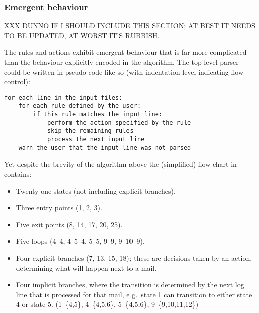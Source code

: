 \subsubsection{Emergent behaviour}

\label{Emergent behaviour}

XXX DUNNO IF I SHOULD INCLUDE THIS SECTION\@; AT BEST IT NEEDS TO BE
UPDATED, AT WORST IT'S RUBBISH\@.

The rules and actions exhibit emergent behaviour that is far more
complicated than the behaviour explicitly encoded in the algorithm.  The
top-level parser could be written in pseudo-code like so (with indentation
level indicating flow control):

\begin{verbatim}
for each line in the input files:
    for each rule defined by the user:
        if this rule matches the input line:
            perform the action specified by the rule
            skip the remaining rules
            process the next input line
    warn the user that the input line was not parsed
\end{verbatim}

Yet despite the brevity of the algorithm above the (simplified) flow chart
in  contains:

\begin{itemize}

    \item Twenty one states (not including explicit branches).

    \item Three entry points (1, 2, 3).

    \item Five exit points (8, 14, 17, 20, 25).

    \item Five loops (4--4, 4--5--4, 5--5, 9--9, 9--10--9).

    \item Four explicit branches (7, 13, 15, 18); these are decisions taken
        by an action, determining what will happen next to a mail.

    \item Four implicit branches, where the transition is determined by the
        next log line that is processed for that mail, e.g.\ state 1 can
        transition to either state 4 or state 5.  (1--\{4,5\},
        4--\{4,5,6\}, 5--\{4,5,6\}, 9--\{9,10,11,12\})

\end{itemize}

